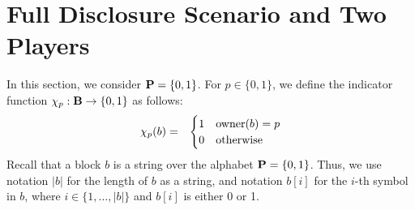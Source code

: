 
\section{Full Disclosure Scenario and Two Players}
\label{sec-fd&2p}
In this section, we consider $\mathbf{P} = \{0,1\}$. For $p \in \{0,1\}$, we define the indicator  function $\chi_p : \mathbf{B} \to \{0,1\}$ as follows:
\begin{eqnarray*}
\chi_p(b) & = & 
\begin{cases}
1 & \text{\rm owner}(b) = p\\
0 & \text{otherwise}
\end{cases}
\end{eqnarray*}
Recall that a block $b$ is a string over the alphabet $\mathbf{P} = \{0,1\}$. Thus, we use notation $|b|$ for the length of $b$ as a string, and notation $b[i]$ for the $i$-th symbol in $b$, where $i \in \{1, \ldots, |b|\}$ and $b[i]$ is either 0 or 1. 

 
